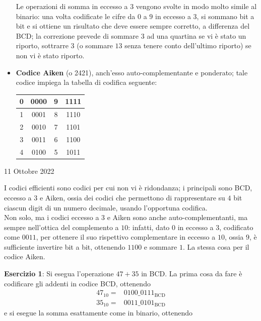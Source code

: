 \documentclass[a4paper]{extarticle}
\renewcommand\arraystretch{}
\begin{document}
\begin{itemize}
    \vspace{1em}
    \noindent
    Le operazioni di somma in eccesso a $3$ vengono svolte in modo molto simile al binario: una volta codificate le cifre da $0$ a $9$ in eccesso a $3$, si sommano bit a bit e si ottiene un risultato che deve essere sempre corretto, a differenza del BCD; la correzione prevede di sommare $3$ ad una quartina se vi è stato un riporto, sottrarre $3$ (o sommare $13$ senza tenere conto dell'ultimo riporto) se non vi è stato riporto.

    \item \textbf{Codice Aiken} (o 2421), anch'esso auto-complementante e ponderato; tale codice impiega la tabella di codifica seguente:
    
    \noindent
    \begin{table}[H]
    \setlength{\tabcolsep}{4pt}
    \renewcommand{\arraystretch}{1.2}
    \centering
    \begin{tabular}{|c|c|c|c|}
        \hline
        0 & 0000 & 9 & 1111\\
        \hline
        1 & 0001 & 8 & 1110\\
        \hline
        2 & 0010 & 7 & 1101\\
        \hline
        3 & 0011 & 6 & 1100\\
        \hline
        4 & 0100 & 5 & 1011\\
        \hline
    \end{tabular}
    \end{table}
\end{itemize}

\newpage
\begin{center}
    11 Ottobre 2022
\end{center}
I codici efficienti sono codici per cui non vi è ridondanza; i principali sono BCD, eccesso a $3$ e Aiken, ossia dei codici che permettono di rappresentare su $4$ bit ciascun digit di un numero decimale, usando l'opportuna codifica.\\
Non solo, ma i codici eccesso a $3$ e Aiken sono anche auto-complementanti, ma sempre nell'ottica del complemento a $10$: infatti, dato $0$ in eccesso a $3$, codificato come $0011$, per ottenere il suo rispettivo complementare in eccesso a $10$, ossia $9$, è sufficiente invertire bit a bit, ottenendo $1100$ e sommare $1$. La stessa cosa per il codice Aiken.

\vspace{1em}
\noindent
\textbf{Esercizio 1}: Si esegua l'operazione $47+35$ in BCD. La prima cosa da fare è codificare gli addenti in codice BCD, ottenendo
\begin{align*}
    47_{10} = & 0100\_0111_{\text{BCD}}\\
    35_{10} = & 0011\_0101_{\text{BCD}}
\end{align*}
e si esegue la somma esattamente come in binario, ottenendo
\end{document}
